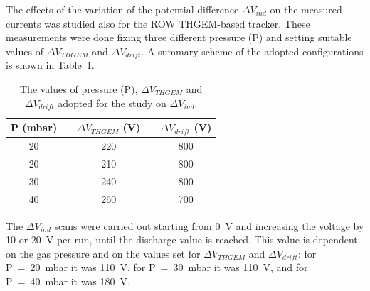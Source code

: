 \documentclass[a4paper, 11 pt]{article}
\newcommand{\Vind}{$\Delta V_{ind}$}
\newcommand{\Vthgem}{$\Delta V_{THGEM}$}
\newcommand{\Vdrift}{$ \Delta V_{drift}$}
\begin{document}
The effects of the variation of the potential difference \Vind{} on the measured currents was studied also for the ROW THGEM-based tracker.
These measurements were done fixing three different pressure (P) and setting suitable values of \Vthgem{} and \Vdrift.
A summary scheme of the adopted configurations is shown in Table~\ref{tab:ROWTHGEM_vind}.
\begin{table} [htbp]
	\begin{center}
		\renewcommand{\arraystretch}{1.2}
		\begin{tabular} {ccccc}
			P (mbar) & & \Vthgem{} (V) & & \Vdrift{} (V)\\
			\toprule[0.1em]
			20	& &	220	& &	800 \\
			20	& & 210	& & 800 \\
			30	& &	240	& &	800 \\
			40	& &	260	& &	700 \\
			
			\bottomrule[0.1em]
		\end{tabular}
	\end{center}
	\caption{The values of pressure (P), \Vthgem{} and \Vdrift{} adopted for the study on \Vind.} \label{tab:ROWTHGEM_vind}
\end{table}
The \Vind{} scans were carried out starting from 0~V and increasing the voltage by 10 or 20~V per run, until the discharge value is reached.
This value is dependent on the gas pressure and on the values set for \Vthgem{} and \Vdrift: for P~=~20~mbar it was 110~V, for P~=~30~mbar it was 110~V, and for P~=~40~mbar it was 180~V.
\end{document}
